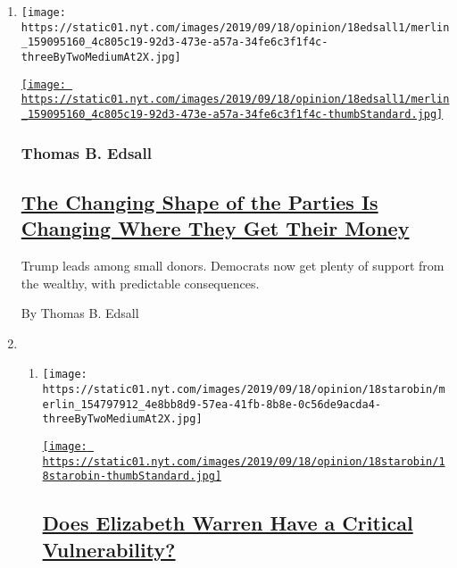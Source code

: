 \begin{enumerate}
\def\labelenumi{\arabic{enumi}.}
\item
  \texttt{[image: https://static01.nyt.com/images/2019/09/18/opinion/18edsall1/merlin\_159095160\_4c805c19-92d3-473e-a57a-34fe6c3f1f4c-threeByTwoMediumAt2X.jpg]}

  \href{/2019/09/18/opinion/trump-fundraising-donors.html}{\texttt{[image: https://static01.nyt.com/images/2019/09/18/opinion/18edsall1/merlin\_159095160\_4c805c19-92d3-473e-a57a-34fe6c3f1f4c-thumbStandard.jpg]}}

  \hypertarget{thomas-b-edsall}{%
  \subsubsection{Thomas B. Edsall}\label{thomas-b-edsall}}

  \hypertarget{the-changing-shape-of-the-parties-is-changing-where-they-get-their-money}{%
  \subsection{\texorpdfstring{\href{/2019/09/18/opinion/trump-fundraising-donors.html}{The
  Changing Shape of the Parties Is Changing Where They Get Their
  Money}}{The Changing Shape of the Parties Is Changing Where They Get Their Money}}\label{the-changing-shape-of-the-parties-is-changing-where-they-get-their-money}}

  Trump leads among small donors. Democrats now get plenty of support
  from the wealthy, with predictable consequences.

  By Thomas B. Edsall
\item
  \begin{enumerate}
  \def\labelenumii{\arabic{enumii}.}
  \item
    \texttt{[image: https://static01.nyt.com/images/2019/09/18/opinion/18starobin/merlin\_154797912\_4e8bb8d9-57ea-41fb-8b8e-0c56de9acda4-threeByTwoMediumAt2X.jpg]}

    \href{/2019/09/18/opinion/elizabeth-warren-massachusetts.html}{\texttt{[image: https://static01.nyt.com/images/2019/09/18/opinion/18starobin/18starobin-thumbStandard.jpg]}}

    \hypertarget{does-elizabeth-warren-have-a-critical-vulnerability}{%
    \subsection{\texorpdfstring{\href{/2019/09/18/opinion/elizabeth-warren-massachusetts.html}{Does
    Elizabeth Warren Have a Critical
    Vulnerability?}}{Does Elizabeth Warren Have a Critical Vulnerability?}}\label{does-elizabeth-warren-have-a-critical-vulnerability}}


\end{enumerate}
\end{enumerate}
